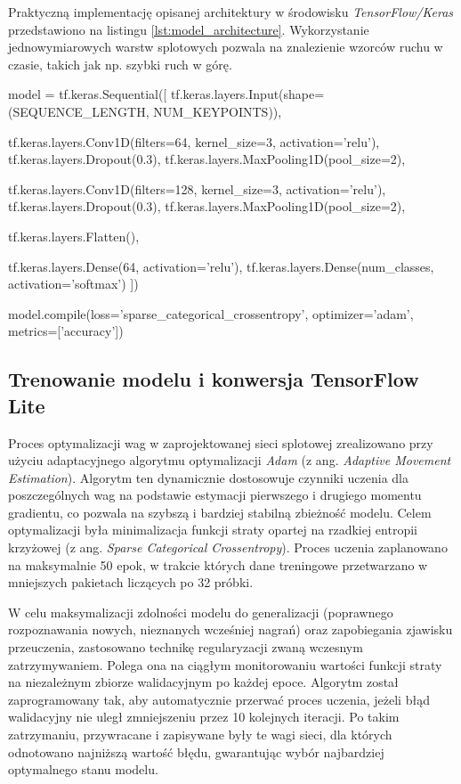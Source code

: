         Praktyczną implementację opisanej architektury w środowisku \textit{TensorFlow/Keras} przedstawiono na listingu \ref{lst:model_architecture}. Wykorzystanie jednowymiarowych warstw splotowych pozwala na znalezienie wzorców ruchu w czasie, takich jak np. szybki ruch w górę.

        \begin{code}[
    language=Python,
    caption={Definicja architektury sieci 1D–CNN w bibliotece TensorFlow.},
    label={lst:model_architecture}
]
model = tf.keras.Sequential([
    tf.keras.layers.Input(shape=(SEQUENCE_LENGTH, NUM_KEYPOINTS)),

    tf.keras.layers.Conv1D(filters=64, kernel_size=3, activation='relu'),
    tf.keras.layers.Dropout(0.3),
    tf.keras.layers.MaxPooling1D(pool_size=2),

    tf.keras.layers.Conv1D(filters=128, kernel_size=3, activation='relu'),
    tf.keras.layers.Dropout(0.3),
    tf.keras.layers.MaxPooling1D(pool_size=2),

    tf.keras.layers.Flatten(),

    tf.keras.layers.Dense(64, activation='relu'),
    tf.keras.layers.Dense(num_classes, activation='softmax')
])

model.compile(loss='sparse_categorical_crossentropy', 
optimizer='adam', metrics=['accuracy'])
\end{code}

    \subsection{Trenowanie modelu i konwersja TensorFlow Lite}

        Proces optymalizacji wag w zaprojektowanej sieci splotowej zrealizowano przy użyciu adaptacyjnego algorytmu optymalizacji \textit{Adam} (z ang. \textit{Adaptive Movement Estimation}). Algorytm ten dynamicznie dostosowuje czynniki uczenia dla poszczególnych wag na podstawie estymacji pierwszego i drugiego momentu gradientu, co pozwala na szybszą i bardziej stabilną zbieżność modelu. Celem optymalizacji była minimalizacja funkcji straty opartej na rzadkiej entropii krzyżowej (z ang. \textit{Sparse Categorical Crossentropy}). Proces uczenia zaplanowano na maksymalnie 50 epok, w trakcie których dane treningowe przetwarzano w mniejszych pakietach liczących po 32 próbki.

        W celu maksymalizacji zdolności modelu do generalizacji (poprawnego rozpoznawania nowych, nieznanych wcześniej nagrań) oraz zapobiegania zjawisku przeuczenia, zastosowano technikę regularyzacji zwaną wczesnym zatrzymywaniem. Polega ona na ciągłym monitorowaniu wartości funkcji straty na niezależnym zbiorze walidacyjnym po każdej epoce. Algorytm został zaprogramowany tak, aby automatycznie przerwać proces uczenia, jeżeli błąd walidacyjny nie uległ zmniejszeniu przez 10 kolejnych iteracji. Po takim zatrzymaniu, przywracane i zapisywane były te wagi sieci, dla których odnotowano najniższą wartość błędu, gwarantując wybór najbardziej optymalnego stanu modelu.

